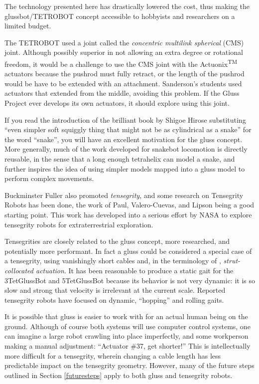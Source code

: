 \documentclass[11pt]{article}
\begin{document}
The technology presented here has drastically lowered the cost,
thus making the glussbot/TETROBOT concept
accessible to hobbyists and researchers on a limited budget.

The TETROBOT used a joint called the \emph{concentric multilink spherical} (CMS) joint. Although
possibly superior in not allowing an extra degree or rotational freedom, it would be a challenge to use the CMS
joint with the Actuonix\textsuperscript{TM} actuators because the pushrod must fully retract, or the length of the pushrod would be
have to be extended with an attachment. Sanderson's students used actuators that
extended from the middle, avoiding this problem. If the Gluss Project ever develops its own actuators, it should
explore using this joint.

If you read the introduction of the brilliant book by Shigoe Hirose\cite{hirose1993biologically} substituting
``even simpler soft squiggly thing that might not be as cylindrical as a snake'' for the word ``snake'', you will have
an excellent motivation for the gluss concept.  More generally, much of the work developed for snakebot
locomotion\cite{liljebäck2012snake} is directly reusable, in the sense that a long enough tetrahelix can
model a snake, and further inspires the idea of using simpler models mapped into a gluss model to perform
complex movements.

Buckminster Fuller also promoted \emph{tensegrity}, and some research on Tensegrity Robots has been done, the
work of Paul, Valero-Cuevas, and Lipson\cite{paul2006} being a good starting point.
This work has developed into a serious effort\cite{NTRT} by NASA to explore tensegrity robots
for extraterrestrial
exploration.

Tensegrities are closely related to the gluss concept, more researched, and potentially more performant.
In fact a gluss could be considered a special case of a tensegrity, using vanishingly short cables
and, in the terminology of \cite{paul2006}, \emph{strut-collocated actuation}.
It has been reasonable to produce a static gait for the 3TetGlussBot and 5TetGlussBot because its behavior is not
very dynamic: it is so slow and strong that velocity is irrelevant at the current scale.
Reported tensegrity robots have focused on dynamic, ``hopping'' and rolling gaits.

It is possible that gluss is easier to work with for an actual human being on the ground.
Although of course both systems will use computer control systems, one can imagine a large robot
crawling into place imperfectly, and some workperson making a manual adjustment: ``Actuator \#37, get shorter!''
This is intellectually more difficult for a tensegrity, wherein changing a cable length
has less predictable impact on the tensegrity geometry.
However, many
of the future steps outlined in Section \ref{futuresteps} apply to both gluss and tensegrity robots.
\end{document}
